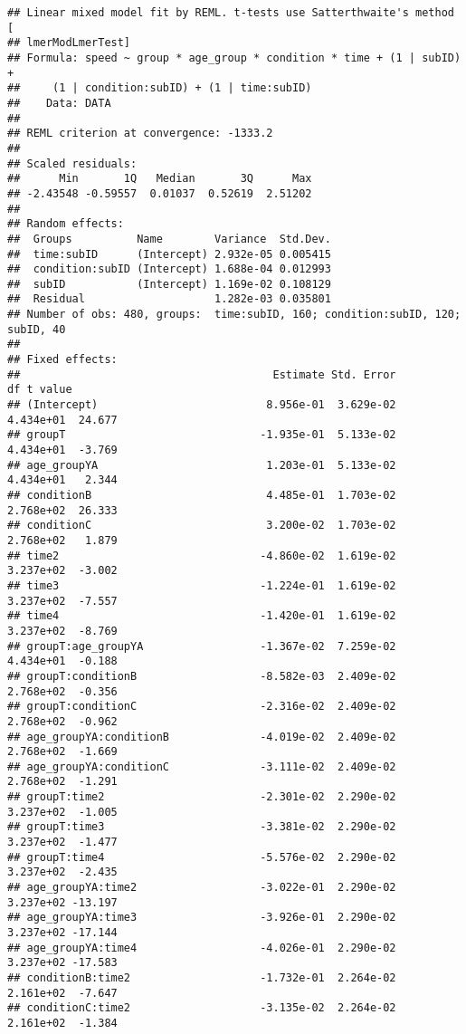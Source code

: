 \documentclass[]{article}
\begin{document}
\begin{verbatim}
## Linear mixed model fit by REML. t-tests use Satterthwaite's method [
## lmerModLmerTest]
## Formula: speed ~ group * age_group * condition * time + (1 | subID) +  
##     (1 | condition:subID) + (1 | time:subID)
##    Data: DATA
## 
## REML criterion at convergence: -1333.2
## 
## Scaled residuals: 
##      Min       1Q   Median       3Q      Max 
## -2.43548 -0.59557  0.01037  0.52619  2.51202 
## 
## Random effects:
##  Groups          Name        Variance  Std.Dev.
##  time:subID      (Intercept) 2.932e-05 0.005415
##  condition:subID (Intercept) 1.688e-04 0.012993
##  subID           (Intercept) 1.169e-02 0.108129
##  Residual                    1.282e-03 0.035801
## Number of obs: 480, groups:  time:subID, 160; condition:subID, 120; subID, 40
## 
## Fixed effects:
##                                       Estimate Std. Error         df t value
## (Intercept)                          8.956e-01  3.629e-02  4.434e+01  24.677
## groupT                              -1.935e-01  5.133e-02  4.434e+01  -3.769
## age_groupYA                          1.203e-01  5.133e-02  4.434e+01   2.344
## conditionB                           4.485e-01  1.703e-02  2.768e+02  26.333
## conditionC                           3.200e-02  1.703e-02  2.768e+02   1.879
## time2                               -4.860e-02  1.619e-02  3.237e+02  -3.002
## time3                               -1.224e-01  1.619e-02  3.237e+02  -7.557
## time4                               -1.420e-01  1.619e-02  3.237e+02  -8.769
## groupT:age_groupYA                  -1.367e-02  7.259e-02  4.434e+01  -0.188
## groupT:conditionB                   -8.582e-03  2.409e-02  2.768e+02  -0.356
## groupT:conditionC                   -2.316e-02  2.409e-02  2.768e+02  -0.962
## age_groupYA:conditionB              -4.019e-02  2.409e-02  2.768e+02  -1.669
## age_groupYA:conditionC              -3.111e-02  2.409e-02  2.768e+02  -1.291
## groupT:time2                        -2.301e-02  2.290e-02  3.237e+02  -1.005
## groupT:time3                        -3.381e-02  2.290e-02  3.237e+02  -1.477
## groupT:time4                        -5.576e-02  2.290e-02  3.237e+02  -2.435
## age_groupYA:time2                   -3.022e-01  2.290e-02  3.237e+02 -13.197
## age_groupYA:time3                   -3.926e-01  2.290e-02  3.237e+02 -17.144
## age_groupYA:time4                   -4.026e-01  2.290e-02  3.237e+02 -17.583
## conditionB:time2                    -1.732e-01  2.264e-02  2.161e+02  -7.647
## conditionC:time2                    -3.135e-02  2.264e-02  2.161e+02  -1.384

\end{verbatim}
\end{document}
